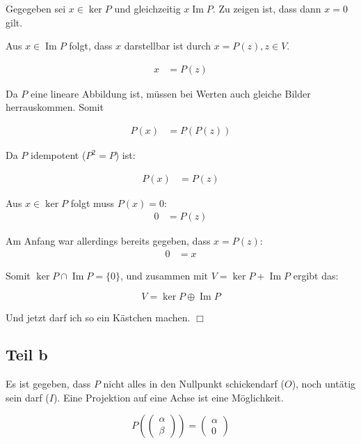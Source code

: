 \documentclass[a4paper,german,12pt,smallheadings]{scrartcl}
\begin{document}
Gegegeben sei $x \in \ker P$ und gleichzeitig $x \operatorname{Im} P$. Zu
zeigen ist, dass dann $x = 0$ gilt.

Aus $x \in \operatorname{Im} P$ folgt, dass $x$ darstellbar ist durch $x =
P(z), z \in V$.

\begin{align*}
  x &= P(z)
\end{align*}

Da $P$ eine lineare Abbildung ist, müssen bei Werten auch gleiche Bilder herrauskommen. Somit

\begin{align*}
  P(x) &= P(P(z))
\end{align*}

Da $P$ idempotent ($P^2 = P$) ist:

\begin{align*}
  P(x) &= P(z)
\end{align*}

Aus $x \in \ker P$ folgt muss $P(x) = 0$:
\begin{align*}
  0 &= P(z)
\end{align*}

Am Anfang war allerdings bereits gegeben, dass $x = P(z)$:
\begin{align*}
  0 &= x
\end{align*}

Somit $\ker P \cap \operatorname{Im} P = \{0\}$, und zusammen mit $V = \ker P + \operatorname{Im} P$ ergibt das:

\begin{equation}
  V = \ker P \oplus \operatorname{Im} P
\end{equation}

Und jetzt darf ich so ein Kästchen machen. $\Box$

\subsection*{Teil b}

Es ist gegeben, dass $P$ nicht alles in den Nullpunkt schickendarf ($O$), noch
untätig sein darf ($I$). Eine Projektion auf eine Achse ist eine Möglichkeit.

\begin{equation} 
  P\left(\begin{pmatrix} \alpha \\ \beta \end{pmatrix}\right) =
    \begin{pmatrix}\alpha \\ 0\end{pmatrix}
\end{equation}
\end{document}
